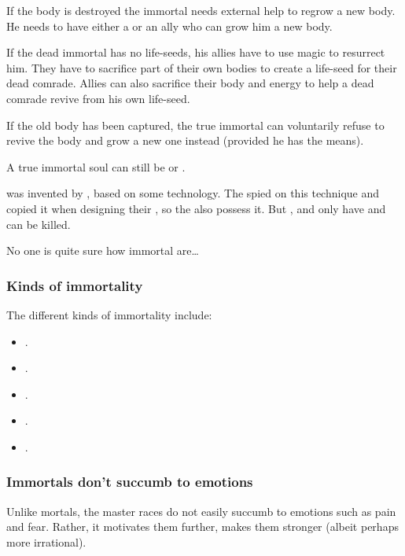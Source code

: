 If the body is destroyed the immortal needs external help to regrow a new body. 
He needs to have either a  or an ally who can grow him a new body.

If the dead immortal has no life-seeds, his allies have to use magic to resurrect him.
They have to sacrifice part of their own bodies to create a life-seed for their dead comrade. 
Allies can also sacrifice their body and energy to help a dead comrade revive from his own life-seed. 

If the old body has been captured, the true immortal can voluntarily refuse to revive the body and grow a new one instead (provided he has the means).

A true immortal soul can still be  or . 

 was invented by \TyarithXserasshana, based on some \xsic{} technology. 
The \banelords{} spied on this technique and copied it when designing their \resphain, so the \resphain{} also possess it. 
But \quiljaaran, \vorcanths{} and \aryothim{} only have  and can be killed. 

No one is quite sure how immortal \banes{} are\ldots{}





\subsubsection{Kinds of immortality}
The different kinds of immortality include: 
\begin{itemize}
  \item {}. 
  \item {}. 
  \item {}. 
  \item {}. 
  \item {}. 
\end{itemize}








\subsubsection{Immortals don't succumb to emotions}
Unlike mortals, the master races do not easily succumb to emotions such as pain and fear. 
Rather, it motivates them further, makes them stronger (albeit perhaps more irrational). 





